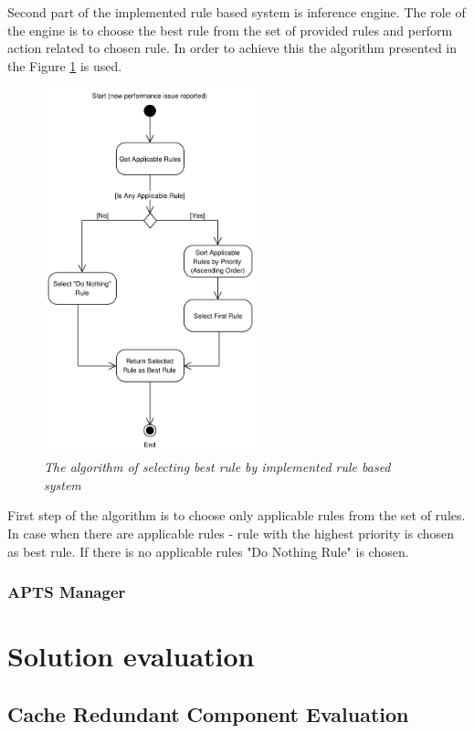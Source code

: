\documentclass[10pt,a4paper]{article}
\begin{document}
Second part of the implemented rule based system is inference engine. The role of the engine is to choose the best rule from the set of provided rules and perform action related to chosen rule. In order to achieve this the algorithm presented in the Figure \ref{dmalgorithm} is used. 

\begin{figure}[!htb]
\centering
\includegraphics[width=0.55\textwidth]{DecisionModuleActivityDiagram}
\caption{\textit{The algorithm of selecting best rule by implemented rule based system}} \label{dmalgorithm}
\end{figure}

First step of the algorithm is to choose only applicable rules from the set of rules. In case when there are applicable rules - rule with the highest priority is chosen as best rule. If there is no applicable rules "Do Nothing Rule" is chosen.

\subsubsection{APTS Manager} \label{dm}

\section{Solution evaluation} 
\subsection{Cache Redundant Component Evaluation}
\end{document}
